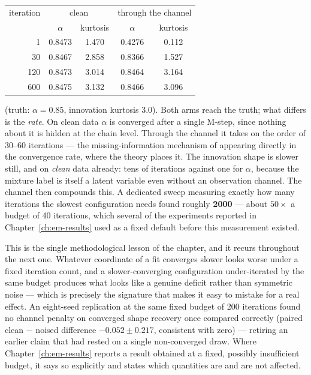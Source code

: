\begin{center}
\begin{tabular}{@{}rcccc@{}}
\toprule
iteration & \multicolumn{2}{c}{clean} & \multicolumn{2}{c}{through the channel} \\
 & $\alpha$ & kurtosis & $\alpha$ & kurtosis \\
\midrule
1   & 0.8473 & 1.470 & 0.4276 & 0.112 \\
30  & 0.8467 & 2.858 & 0.8366 & 1.527 \\
120 & 0.8473 & 3.014 & 0.8464 & 3.164 \\
600 & 0.8475 & 3.132 & 0.8466 & 3.096 \\
\bottomrule
\end{tabular}
\end{center}
\noindent(truth: $\alpha=0.85$, innovation kurtosis $3.0$). Both arms reach
the truth; what differs is the \emph{rate}. On clean data $\alpha$ is
converged after a single M-step, since nothing about it is hidden at the
chain level. Through the channel it takes on the order of $30$--$60$
iterations --- the missing-information mechanism of
\citet{dempster1977maximum} appearing directly in the convergence rate, where
the theory places it. The innovation shape is slower still, and on \emph{clean}
data already: tens of iterations against one for $\alpha$, because the
mixture label is itself a latent variable even without an observation
channel. The channel then compounds this. A dedicated sweep measuring exactly
how many iterations the slowest configuration needs found roughly
\textbf{2000} --- about $50\times$ a budget of 40 iterations, which several of
the experiments reported in Chapter~\ref{ch:em-results} used as a fixed
default before this measurement existed.

\begin{remark}
\label{rmk:em-fixed-budget}
This is the single methodological lesson of the chapter, and it recurs
throughout the next one. Whatever coordinate of a fit converges slower looks
worse under a fixed iteration count, and a slower-converging configuration
under-iterated by the same budget produces what looks like a genuine deficit
rather than symmetric noise --- which is precisely the signature that makes it
easy to mistake for a real effect. An eight-seed replication at the same
fixed budget of 200 iterations found no channel penalty on converged shape
recovery once compared correctly (paired clean $-$ noised difference
$-0.052\pm0.217$, consistent with zero) --- retiring an earlier claim that
had rested on a single non-converged draw. Where Chapter~\ref{ch:em-results}
reports a result obtained at a fixed, possibly insufficient budget, it says so
explicitly and states which quantities are and are not affected.
\end{remark}

